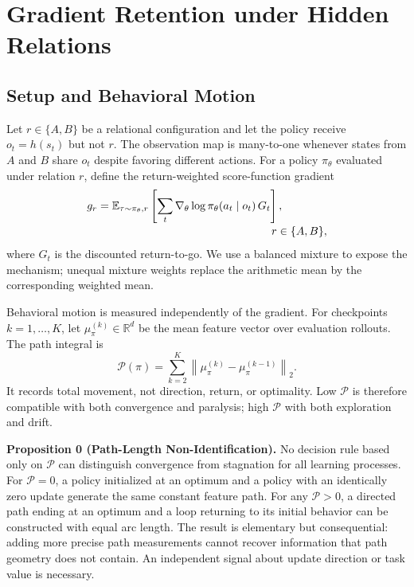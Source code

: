\documentclass[letterpaper]{article}
\begin{document}
\section{Gradient Retention under Hidden Relations}

\subsection{Setup and Behavioral Motion}

Let $r\in\{A,B\}$ be a relational configuration and let the policy receive $o_t=h(s_t)$ but not $r$.
The observation map is many-to-one whenever states from $A$ and $B$ share $o_t$ despite favoring different actions.
For a policy $\pi_\theta$ evaluated under relation $r$, define the return-weighted score-function gradient
\begin{equation}
\begin{split}
g_r &=
\mathbb{E}_{\tau\sim\pi_\theta,r}
\left[
\sum_t \nabla_\theta\log\pi_\theta(a_t\mid o_t)\,G_t
\right],\\[-2pt]
&\hspace{5.5cm} r\in\{A,B\},
\end{split}
\label{eq:grad}
\end{equation}
where $G_t$ is the discounted return-to-go.
We use a balanced mixture to expose the mechanism; unequal mixture weights replace the arithmetic mean by the corresponding weighted mean.

Behavioral motion is measured independently of the gradient.
For checkpoints $k=1,\ldots,K$, let $\mu_\pi^{(k)}\in\mathbb{R}^d$ be the mean feature vector over evaluation rollouts.
The path integral is
\begin{equation}
\mathcal{P}(\pi)=
\sum_{k=2}^{K}
\left\|\mu_\pi^{(k)}-\mu_\pi^{(k-1)}\right\|_2 .
\label{eq:path}
\end{equation}
It records total movement, not direction, return, or optimality.
Low $\mathcal{P}$ is therefore compatible with both convergence and paralysis; high $\mathcal{P}$ with both exploration and drift.

\medskip
\noindent\textbf{Proposition 0 (Path-Length Non-Identification).}
No decision rule based only on $\mathcal{P}$ can distinguish convergence from stagnation for all learning processes.
For $\mathcal{P}=0$, a policy initialized at an optimum and a policy with an identically zero update generate the same constant feature path.
For any $\mathcal{P}>0$, a directed path ending at an optimum and a loop returning to its initial behavior can be constructed with equal arc length.
The result is elementary but consequential: adding more precise path measurements cannot recover information that path geometry does not contain.
An independent signal about update direction or task value is necessary.
\end{document}
